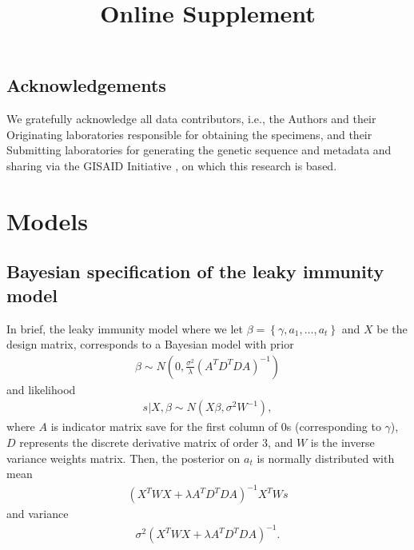 \documentclass{article}
\newcommand{\beginsupplement}{
  \setcounter{table}{0}  
  \renewcommand{\thetable}{S\arabic{table}} 
  \setcounter{figure}{0} 
  \renewcommand{\thefigure}{S\arabic{figure}}
  \setcounter{section}{0} 
  \renewcommand{\thesection}{S\arabic{section}}
}
\begin{document}
\subsection*{Acknowledgements}

We gratefully acknowledge all data contributors, i.e., the Authors and their
Originating laboratories responsible for obtaining the specimens, and their
Submitting laboratories for generating the genetic sequence and metadata and
sharing via the GISAID Initiative \citep{elbe2017data}, on which this research
is based.



\newpage



\newpage
\beginsupplement
\title{\supptitlefont Online Supplement}
\maketitle

\section{Models}
\subsection{Bayesian specification of the leaky immunity
model}\label{supp:bayesleaky} 
In brief, the leaky immunity model where we let
$\beta = \left \{  \gamma, a_1,\dots, a_t \right \}$ and $X$ be the design
matrix, corresponds to a Bayesian model with prior 
\begin{align*}
    \beta \sim N \left( 0,  \frac{\sigma^2 }{ \lambda} \left( A^TD^TDA 
    \right)^{-1}  \right)
\end{align*} and likelihood 
\begin{align*}
    s|X,\beta \sim N \left( X\beta, \sigma^2W^{-1} \right),
\end{align*} where $A$ is indicator matrix save for the first column of $0$s 
(corresponding to $\gamma$), $D$ represents the discrete derivative matrix of 
order $3$, and $W$ is the inverse variance weights matrix. Then, the posterior 
on $a_t$ is normally distributed with mean 
\begin{align*}
    \left ( X^TWX + \lambda A^TD^TDA \right )^{-1}X^TWs
\end{align*} 
and variance 
\begin{align*}
    \sigma^2 (X^TWX + \lambda A^TD^TDA)^{-1}.
\end{align*}
\end{document}
